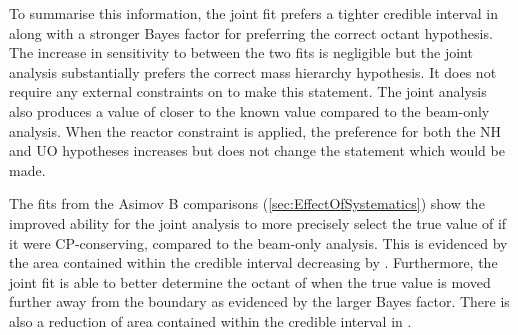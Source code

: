 To summarise this information, the joint fit prefers a tighter \quickmath{1\sigma} credible interval in  along with a stronger Bayes factor for preferring the correct octant hypothesis. The increase in sensitivity to  between the two fits is negligible but the joint analysis substantially prefers the correct mass hierarchy hypothesis. It does not require any external constraints on  to make this statement. The joint analysis also produces a value of  closer to the known value compared to the beam-only analysis. When the reactor constraint is applied, the preference for both the NH and UO hypotheses increases but does not change the statement which would be made.

The fits from the Asimov B comparisons (\autoref{sec:EffectOfSystematics}) show the improved ability for the joint analysis to more precisely select the true value of  if it were CP-conserving, compared to the beam-only analysis. This is evidenced by the area contained within the \quickmath{1\sigma} credible interval decreasing by . Furthermore, the joint fit is able to better determine the octant of  when the true value is moved further away from the boundary as evidenced by the larger Bayes factor. There is also a  reduction of area contained within the \quickmath{1\sigma} credible interval in .
